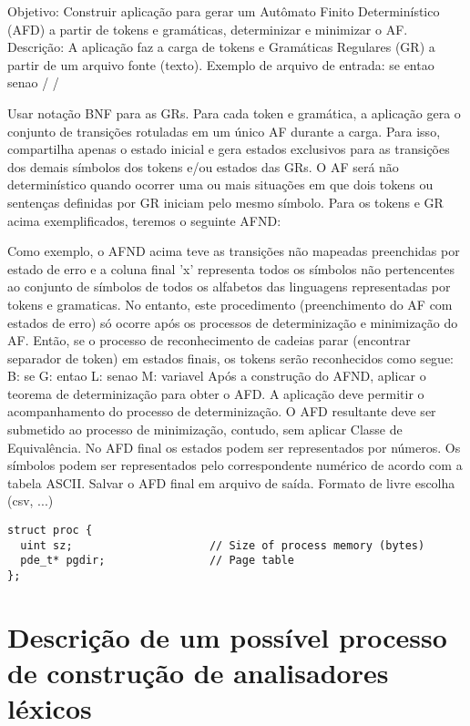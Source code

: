 \documentclass[12pt]{article}
\begin{document}
Objetivo:
Construir aplicação para gerar um Autômato Finito Determinístico (AFD) a partir de tokens e
gramáticas, determinizar e minimizar o AF.
Descrição:
A aplicação faz a carga de tokens e Gramáticas Regulares (GR) a partir de um arquivo fonte (texto).
Exemplo de arquivo de entrada:
se
entao
senao
/%
/%

Usar notação BNF para as GRs.
Para cada token e gramática, a aplicação gera o conjunto de transições rotuladas em um único AF
durante a carga. Para isso, compartilha apenas o estado inicial e gera estados exclusivos para as
transições dos demais símbolos dos tokens e/ou estados das GRs.
O AF será não determinístico quando ocorrer uma ou mais situações em que dois tokens ou sentenças
definidas por GR iniciam pelo mesmo símbolo.
Para os tokens e GR acima exemplificados, teremos o seguinte AFND:

Como exemplo, o AFND acima teve as transições não mapeadas preenchidas por estado de erro e a
coluna final 'x' representa todos os símbolos não pertencentes ao conjunto de símbolos de todos os
alfabetos das linguagens representadas por tokens e gramaticas. No entanto, este procedimento
(preenchimento do AF com estados de erro) só ocorre após os processos de determinização e
minimização do AF.
Então, se o processo de reconhecimento de cadeias parar (encontrar separador de token) em estados
finais, os tokens serão reconhecidos como segue:
B: se
G: entao
L: senao
M: variavel
Após a construção do AFND, aplicar o teorema de determinização para obter o AFD. A aplicação deve
permitir o acompanhamento do processo de determinização.
O AFD resultante deve ser submetido ao processo de minimização, contudo, sem aplicar Classe de
Equivalência. No AFD final os estados podem ser representados por números. Os símbolos podem ser
representados pelo correspondente numérico de acordo com a tabela ASCII.
Salvar o AFD final em arquivo de saída. Formato de livre escolha (csv, ...)

\begin{scriptsize}
\begin{verbatim}
struct proc {
  uint sz;                     // Size of process memory (bytes)
  pde_t* pgdir;                // Page table
};
\end{verbatim}
\end{scriptsize}



\section{Descrição de um possível processo de construção de analisadores léxicos}
\end{document}
